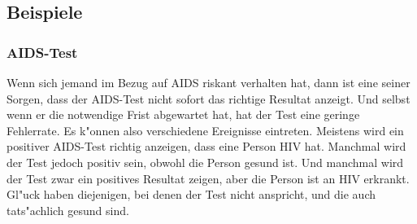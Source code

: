 \subsection{Beispiele}
\subsubsection{AIDS-Test}
Wenn sich jemand im Bezug auf AIDS riskant verhalten hat, dann ist
eine seiner Sorgen, dass der AIDS-Test nicht sofort das richtige
Resultat anzeigt.
Und selbst wenn er die notwendige Frist abgewartet
hat, hat der Test eine geringe Fehlerrate.
Es k"onnen also verschiedene Ereignisse eintreten.
Meistens wird ein
positiver AIDS-Test richtig anzeigen, dass eine Person HIV hat.
Manchmal
wird der Test jedoch positiv sein, obwohl die Person gesund ist.
Und manchmal
wird der Test zwar ein positives Resultat zeigen, aber die Person ist
an HIV erkrankt.
Gl"uck haben diejenigen, bei denen der Test nicht
anspricht, und die auch tats"achlich gesund sind.


